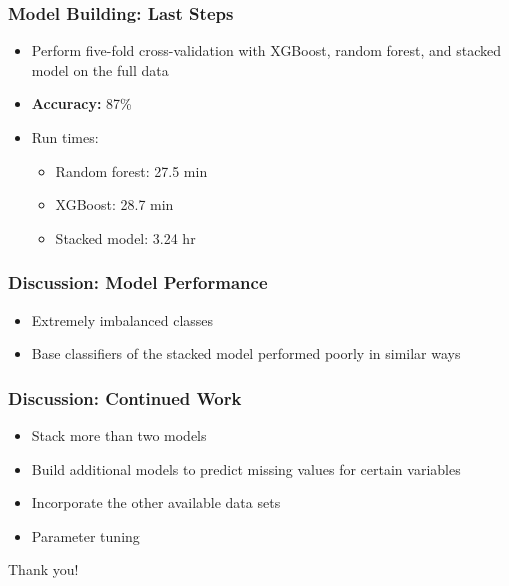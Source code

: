 \documentclass{beamer}
\begin{document}
\begin{frame}
\frametitle{Model Building: Last Steps}
\begin{itemize}
  \item Perform five-fold cross-validation with XGBoost, random forest, and stacked model on the full data 
  \item \textbf{Accuracy:} 87\%
  \item Run times: 
  \begin{itemize}
    \item Random forest: 27.5 min
    \item XGBoost: 28.7 min
    \item Stacked model: 3.24 hr
  \end{itemize}
\end{itemize}
\end{frame}


\begin{frame}
\frametitle{Discussion: Model Performance}
\begin{itemize}
  \item Extremely imbalanced classes
  \item Base classifiers of the stacked model performed poorly in similar ways
\end{itemize}
\end{frame}


\begin{frame}
\frametitle{Discussion: Continued Work}
\begin{itemize}
  \item Stack more than two models 
  \item Build additional models to predict missing values for certain variables
  \item Incorporate the other available data sets 
  \item Parameter tuning
\end{itemize}
\end{frame}


\begin{frame}
Thank you!
\end{frame}
\end{document}
